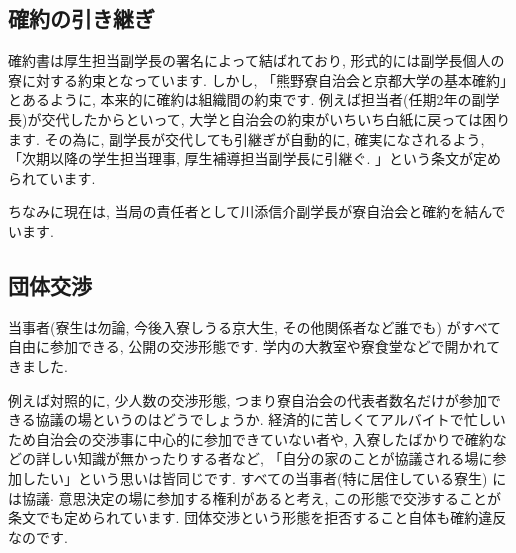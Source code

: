 \documentclass[10pt,b5jsbook,dvips,dvipdfmx,openany]{jsbook}
\theoremstyle{definition}
\begin{document}
		\subsection{確約の引き継ぎ}
		確約書は厚生担当副学長の署名によって結ばれており, 形式的には副学長個人の寮に対する約束となっています. しかし, 「熊野寮自治会と京都大学の基本確約」とあるように, 本来的に確約は組織間の約束です. 例えば担当者(任期2年の副学長)が交代したからといって, 大学と自治会の約束がいちいち白紙に戻っては困ります. その為に, 副学長が交代しても引継ぎが自動的に, 確実になされるよう, 「次期以降の学生担当理事, 厚生補導担当副学長に引継ぐ. 」という条文が定められています.

		ちなみに現在は, 当局の責任者として川添信介副学長が寮自治会と確約を結んでいます.

		\subsection{団体交渉}
		当事者(寮生は勿論, 今後入寮しうる京大生, その他関係者など誰でも) がすべて自由に参加できる, 公開の交渉形態です. 学内の大教室や寮食堂などで開かれてきました.

		例えば対照的に, 少人数の交渉形態, つまり寮自治会の代表者数名だけが参加できる協議の場というのはどうでしょうか. 経済的に苦しくてアルバイトで忙しいため自治会の交渉事に中心的に参加できていない者や, 入寮したばかりで確約などの詳しい知識が無かったりする者など, 「自分の家のことが協議される場に参加したい」という思いは皆同じです. すべての当事者(特に居住している寮生) には協議$ \cdot $ 意思決定の場に参加する権利があると考え, この形態で交渉することが条文でも定められています. 団体交渉という形態を拒否すること自体も確約違反なのです.
\end{document}
